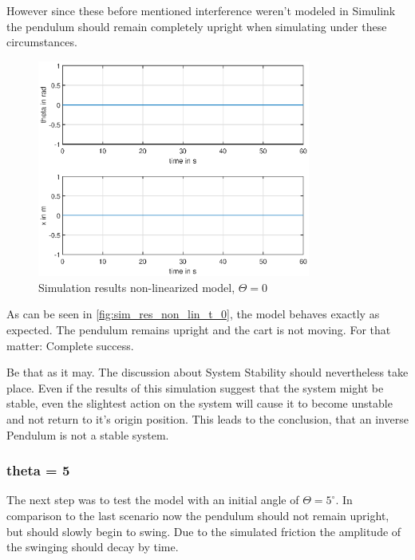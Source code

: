 However since these before mentioned interference weren't modeled in Simulink the pendulum should remain completely upright when simulating under these circumstances. 
\begin{figure}[H]
    \centering
    \includegraphics[width=0.8\textwidth]{Lab_report/pics/plots/non_linearized_results_theta_0.eps}
    \caption{Simulation results non-linearized model, $\Theta=0$}
    \label{fig:sim_res_non_lin_t_0}
\end{figure}

As can be seen in \autoref{fig:sim_res_non_lin_t_0}, the model behaves exactly as expected. The pendulum remains upright and the cart is not moving. For that matter: Complete success.

Be that as it may. The discussion about System Stability should nevertheless take place. Even if the results of this simulation suggest that the system might be stable, even the slightest action on the system will cause it to become unstable and not return to it's origin position. This leads to the conclusion, that an inverse Pendulum is not a stable system. 

\subsubsection{theta = 5}
The next step was to test the model with an initial angle of $\Theta=5^\circ$. In comparison to the last scenario now the pendulum should not remain upright, but should slowly begin to swing. Due to the simulated friction the amplitude of the swinging should decay by time.

